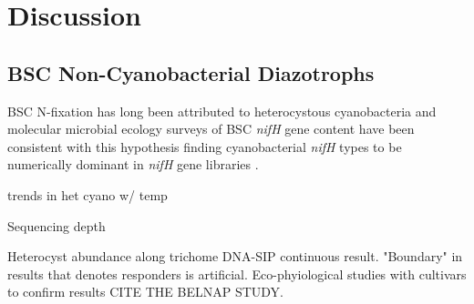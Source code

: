 \section{Discussion}

\subsection{BSC Non-Cyanobacterial Diazotrophs}
BSC N-fixation has long been attributed to heterocystous cyanobacteria and molecular microbial ecology surveys of BSC \textit{nifH} gene content have been consistent with this hypothesis finding cyanobacterial \textit{nifH} types to be numerically dominant in \textit{nifH} gene libraries \cite{Yeager, 14766579, Yeager_2012}. %

\cite{Yeager_2012} trends in het cyano w/ temp

Sequencing depth

Heterocyst abundance along trichome
DNA-SIP continuous result. "Boundary" in results that denotes responders is artificial. Eco-phyiological studies with cultivars to confirm results CITE THE BELNAP STUDY.

